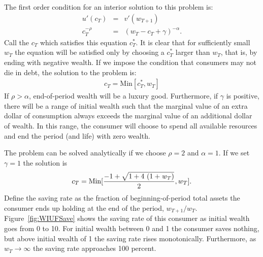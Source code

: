 \documentclass[titlepage,12pt]{article}
\begin{document}
\hypertarget{first-order-condition}{}
The first order condition for an interior solution to this problem is:
\begin{eqnarray}
 	u'(c_{T})    & = & v'(w_{T+1}) \\ \nonumber
 	c_{T}^{-\rho} & = & (w_{T} - c_{T} + \gamma)^{-\alpha}. \nonumber
	\label{eq:LastPeriodEuler}
\end{eqnarray}
Call the $c_{T}$ which satisfies this equation $c_{T}^{*}$.  It is 
clear that for sufficiently small $w_{T}$ the 
equation will be satisfied only by choosing a $c^{*}_{T}$ larger than 
$w_{T}$, that is, by ending with negative wealth.  If we impose the 
condition that consumers may not die in debt, the solution to the 
problem is:
\begin{eqnarray}
 	c_{T} = \mbox{Min}[c^{*}_{T}, w_{T}]  \nonumber
	\label{eq:LastPeriodSoln}
\end{eqnarray}
If $\rho > \alpha$, end-of-period wealth will be a luxury good.  Furthermore, 
if $\gamma$ is positive, there will be a range of initial wealth such 
that the marginal value of an extra dollar of consumption always 
exceeds the marginal value of an additional dollar of wealth.  In this 
range, the consumer will choose to spend all available resources and 
end the period (and life) with zero wealth.

The problem can be solved analytically if we choose $\rho = 2$ and 
$\alpha = 1$.  If we set $\gamma=1$ the solution is
\begin{eqnarray}
    c_{T}=\mbox{Min}[ {{-1 + {\sqrt{1 + 4\,\left( 1 + {\it w_{T}} \right) }}}\over 2}  ,w_{T}].
	\label{eq:GraphSoln}
\end{eqnarray}
Define the saving rate as the fraction of beginning-of-period total 
assets the consumer ends up holding at the end of the period, 
$w_{T+1}/w_{T}$.  Figure~\ref{fig:WIUFSave} shows the saving rate of 
this consumer as initial wealth goes from 0 to 10.  For initial wealth 
between 0 and 1 the consumer saves nothing, but above initial wealth 
of 1 the saving rate rises monotonically.  Furthermore, as $w_{T} 
\rightarrow \infty$ the saving rate approaches 100 percent.  

\hypertarget{WIUFSave}{}
\end{document}
